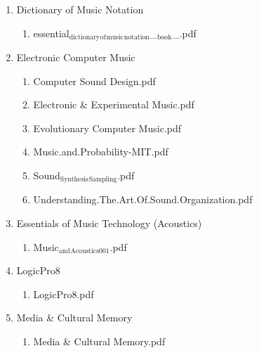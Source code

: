 \documentclass[11pt]{article}
\begin{document}
\begin{enumerate}
\item Dictionary of Music Notation
\label{sec-1-1-1-1-49-1-5-12}
\begin{enumerate}
\item essential$_{\text{dictionary}}$$_{\text{of}}$$_{\text{music}}$$_{\text{notation}}$\_$_{\text{book}}$\_.pdf
\label{sec-1-1-1-1-49-1-5-12-1}
\end{enumerate}

\item Electronic Computer Music
\label{sec-1-1-1-1-49-1-5-13}
\begin{enumerate}
\item Computer Sound Design.pdf
\label{sec-1-1-1-1-49-1-5-13-1}

\item Electronic \& Experimental Music.pdf
\label{sec-1-1-1-1-49-1-5-13-2}

\item Evolutionary Computer Music.pdf
\label{sec-1-1-1-1-49-1-5-13-3}

\item Music.and.Probability-ΜΙΤ.pdf
\label{sec-1-1-1-1-49-1-5-13-4}

\item Sound$_{\text{Synthesis}}$$_{\text{Sampling}}$.pdf
\label{sec-1-1-1-1-49-1-5-13-5}

\item Understanding.The.Art.Of.Sound.Organization.pdf
\label{sec-1-1-1-1-49-1-5-13-6}
\end{enumerate}

\item Essentials of Music Technology (Acoustics)
\label{sec-1-1-1-1-49-1-5-14}
\begin{enumerate}
\item Music$_{\text{and}}$$_{\text{Acoustics001}}$.pdf
\label{sec-1-1-1-1-49-1-5-14-1}
\end{enumerate}

\item LogicPro8
\label{sec-1-1-1-1-49-1-5-15}
\begin{enumerate}
\item LogicPro8.pdf
\label{sec-1-1-1-1-49-1-5-15-1}
\end{enumerate}

\item Media \& Cultural Memory
\label{sec-1-1-1-1-49-1-5-16}
\begin{enumerate}
\item Media \& Cultural Memory.pdf
\label{sec-1-1-1-1-49-1-5-16-1}
\end{enumerate}


\end{enumerate}
\end{document}
